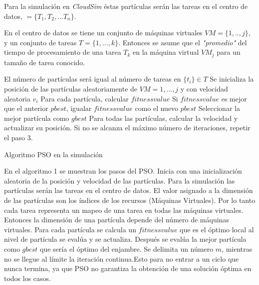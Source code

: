 Para la simulación en \textit{CloudSim} éstas partículas serán las tareas en el centro de datos, $ = \{T_1 , T_2 , ... T_n\}  $.


En el centro de datos se tiene un conjunto de máquinas virtuales $VM = \{1,..,j\}$, y un conjunto de tareas $T = \{1,...,k\}$. Entonces se asume que el \textit{"promedio"} del tiempo de procesamiento de una tarea $T_k$ en la máquina virtual $VM_j$ para un tamaño de tarea conocido.




\begin{algorithm} 
	\begin{algorithmic}[1]
		\State El número de partículas será igual al número de tareas en $ \{ t_i \} \in T $
		\State Se inicializa la posición de las partículas aleatoriamente de $VM = 1,...,j $ y con velocidad aleatoria $v_i$
		\State Para cada partícula, calcular $fitness value$
		\State Si $fitness value$ es mejor que el anterior $pbest$, igualar $fitness value$ como el nuevo $pbest$
		\State Seleccionar la mejor partícula como $gbest$
		\State Para todas las partículas, calcular la velocidad y actualizar su posición.
		\State Si no se alcanza el máximo número de iteraciones, repetir el paso 3.
		
	\end{algorithmic} 
	\caption{Algoritmo PSO en la simulación}
	\label{alg:PSO}
\end{algorithm}

En el algoritmo 1 se muestran los pasos del PSO. Inicia con una inicialización aleatoria de la posición y velocidad de las partículas. Para la simulación las partículas serán las tareas en el centro de datos.
El valor asignado a la dimensión de las partículas son los índices de los recursos (Máquinas Virtuales). Por lo tanto cada tarea representa un mapeo de una tarea en todas las máquinas virtuales. Entonces la dimensión de una partícula depende del número de máquinas virtuales.
Para cada partícula se calcula un $fitnessvalue$ que es el óptimo local al nivel de partícula se evalúa y se actualiza. 
Después se evalúa la mejor partícula como $gbest$ que sería el óptimo del enjambre.
Se delimita un número $m$, mientras no se llegue al límite la iteración continua.Esto para no entrar a un ciclo que nunca termina, ya que PSO  no garantiza la obtención de una solución óptima en todos los casos\cite{osman2012}.

